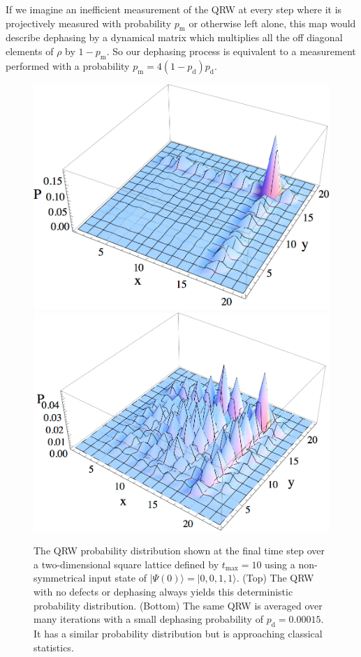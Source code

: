 \documentclass[aps,pra,twocolumn,amsmath,amssymb,nofootinbib,superscriptaddress]{revtex4}
\newcommand{\ket}[1]{|#1\rangle}
\begin{document}
If we imagine an inefficient measurement of the QRW at every step where it is projectively measured with probability $p_{\mathrm{m}}$ or otherwise left alone, this map would describe dephasing by a dynamical matrix which multiplies all the off diagonal elements of $\rho$ by $1-p_{\mathrm{m}}$. So our dephasing process is equivalent to a measurement performed with a probability $p_{\mathrm{m}}=4(1-p_{\mathrm{d}})p_{\mathrm{d}}$.


\begin{figure}[]
\includegraphics[scale=0.5]{AndersonNoDephasing.pdf}\\
\includegraphics[scale=0.5]{AndersonDephasing.pdf}
\caption{\label{fig:AndersonNoDephasing} The QRW probability distribution shown at the final time step over a two-dimensional square lattice defined by $t_\mathrm{max}=10$ using a non-symmetrical input state of $\ket{\Psi(0)}=\ket{0,0,1,1}$. (Top) The QRW with no defects or dephasing always yields this deterministic probability distribution. (Bottom) The same QRW is averaged over many iterations with a small dephasing probability of $p_{\mathrm{d}}=0.00015$. It has a similar probability distribution but is approaching classical statistics.}
\end{figure}
\end{document}
